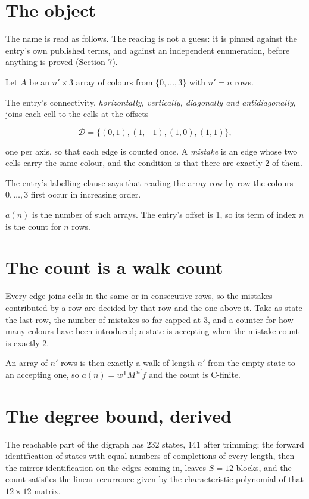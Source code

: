 \documentclass[11pt]{article}
\theoremstyle{definition}
\begin{document}
\section{The object}

The name is read as follows. The reading is not a guess: it is pinned against the entry's own published terms, and against an independent enumeration, before anything is proved (Section 7).

Let $A$ be an $n' \times 3$ array of colours from $\{0,\dots,3\}$ with $n' = n$ rows.

The entry's connectivity, {\itshape horizontally, vertically, diagonally and antidiagonally}, joins each cell to the cells at the offsets

\[\mathcal{D} = \{(0,1), (1,-1), (1,0), (1,1)\},\]

one per axis, so that each edge is counted once. A {\itshape mistake} is an edge whose two cells carry the same colour, and the condition is that there are exactly $2$ of them.

The entry's labelling clause says that reading the array row by row the colours $0,\dots,3$ first occur in increasing order.

$a(n)$ is the number of such arrays. The entry's offset is 1, so its term of index $n$ is the count for $n$ rows.

\section{The count is a walk count}

Every edge joins cells in the same or in consecutive rows, so the mistakes contributed by a row are decided by that row and the one above it. Take as state the last row, the number of mistakes so far capped at $3$, and a counter for how many colours have been introduced; a state is accepting when the mistake count is exactly $2$.

An array of $n'$ rows is then exactly a walk of length $n'$ from the empty state to an accepting one, so $a(n) = w^{\mathsf T}M^{\,n'}f$ and the count is C-finite.

\section{The degree bound, derived}

The reachable part of the digraph has $232$ states, $141$ after trimming; the forward identification of states with equal numbers of completions of every length, then the mirror identification on the edges coming in, leaves $S = 12$ blocks, and the count satisfies the linear recurrence given by the characteristic polynomial of that $12\times12$ matrix.
\end{document}
